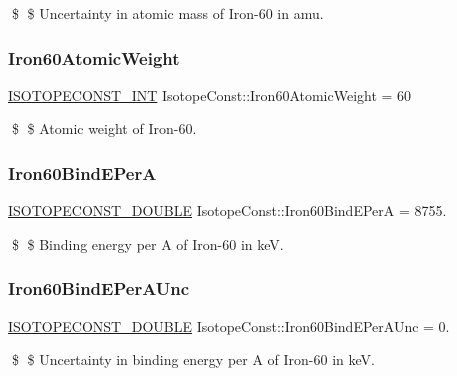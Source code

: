 \$ \$ Uncertainty in atomic mass of Iron-\/60 in amu. \mbox{\label{group___isotope_const-_iron-_fe60_gae3d205b553bddd5427b2d316ccc9369f}} 
\subsubsection{\texorpdfstring{Iron60\+Atomic\+Weight}{Iron60AtomicWeight}}
{\footnotesize\ttfamily \mbox{\hyperlink{group___isotope_const-_macros_ga5f18360b3e99483a35c32d789e62621c}{I\+S\+O\+T\+O\+P\+E\+C\+O\+N\+S\+T\+\_\+\+I\+NT}} Isotope\+Const\+::\+Iron60\+Atomic\+Weight = 60}

\$ \$ Atomic weight of Iron-\/60. \mbox{\label{group___isotope_const-_iron-_fe60_gade65210bca4192d9da13d871354cbacd}} 
\subsubsection{\texorpdfstring{Iron60\+Bind\+E\+PerA}{Iron60BindEPerA}}
{\footnotesize\ttfamily \mbox{\hyperlink{group___isotope_const-_macros_ga8f45a7272ce02c0b4c65c44636ed719a}{I\+S\+O\+T\+O\+P\+E\+C\+O\+N\+S\+T\+\_\+\+D\+O\+U\+B\+LE}} Isotope\+Const\+::\+Iron60\+Bind\+E\+PerA = 8755.}

\$ \$ Binding energy per A of Iron-\/60 in keV. \mbox{\label{group___isotope_const-_iron-_fe60_ga11c87494b8800a05655619738a4c77c1}} 
\subsubsection{\texorpdfstring{Iron60\+Bind\+E\+Per\+A\+Unc}{Iron60BindEPerAUnc}}
{\footnotesize\ttfamily \mbox{\hyperlink{group___isotope_const-_macros_ga8f45a7272ce02c0b4c65c44636ed719a}{I\+S\+O\+T\+O\+P\+E\+C\+O\+N\+S\+T\+\_\+\+D\+O\+U\+B\+LE}} Isotope\+Const\+::\+Iron60\+Bind\+E\+Per\+A\+Unc = 0.}

\$ \$ Uncertainty in binding energy per A of Iron-\/60 in keV. \mbox{\label{group___isotope_const-_iron-_fe60_ga1f3e18ae956ecaa2db783e904ec6f817}} 
